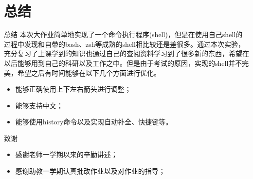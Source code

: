 \documentclass[10pt]{beamer}
\begin{document}
\section{总结}
\begin{frame}{总结}
本次大作业简单地实现了一个命令执行程序(shell)，但是在使用自己shell的过程中发现和自带的bash、zsh等成熟的shell相比较还是差很多。通过本次实验，充分复习了上课学到的知识也通过自己的查阅资料学习到了很多新的东西，希望在以后能够用到自己的科研以及工作之中。但是由于考试的原因，实现的shell并不完美，希望之后有时间能够在以下几个方面进行优化。

\begin{itemize}
	\item 能够正确使用上下左右箭头进行调整；
	\item 能够支持中文；
	\item 能够使用history命令以及实现自动补全、快捷键等。
\end{itemize}
\end{frame}

\begin{frame}{致谢}
\begin{itemize}
	\item 感谢老师一学期以来的辛勤讲述；
	\item 感谢助教一学期认真批改作业以及对作业的指导；
\end{itemize}
\end{frame}
\end{document}
